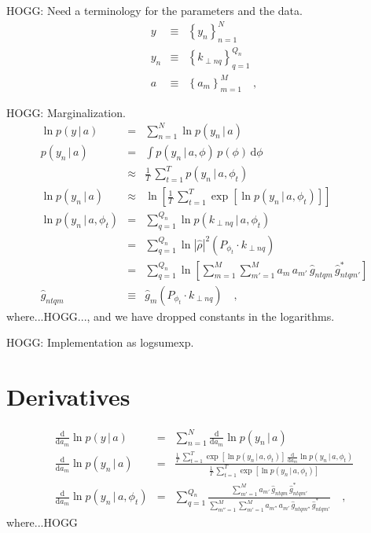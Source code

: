 \documentclass[12pt]{article}
\newcommand{\setof}[1]{\left\{{#1}\right\}}
\newcommand{\given}{\,|\,}
\newcommand{\dd}{\mathrm{d}}
\begin{document}
HOGG: Need a terminology for the parameters and the data.
\begin{eqnarray}
  y &\equiv& \setof{y_n}_{n=1}^N
  \\
  y_n &\equiv& \setof{k_{\perp nq}}_{q=1}^{Q_n}
  \\
  a &\equiv& \setof{a_m}_{m=1}^M
  \quad,
\end{eqnarray}

HOGG: Marginalization.
\begin{eqnarray}
  \ln p(y\given a) &=& \sum_{n=1}^N \ln p(y_n\given a)
  \\
  p(y_n\given a) &=& \int p(y_n\given a,\phi)\,p(\phi)\,\dd\phi
  \\
  &\approx& \frac{1}{T}\,\sum_{t=1}^T p(y_n\given a,\phi_t)
  \\
  \ln p(y_n\given a) &\approx& \ln\left[\frac{1}{T}\,\sum_{t=1}^T \exp\left[\ln p(y_n\given a,\phi_t)\right]\right]
  \\
  \ln p(y_n\given a,\phi_t) &=& \sum_{q=1}^{Q_n} \ln p(k_{\perp nq}\given a,\phi_t)
  \\
  &=& \sum_{q=1}^{Q_n} \ln |\hat{\rho}|^2(P_{\phi_t}\cdot k_{\perp nq})
  \\
  &=& \sum_{q=1}^{Q_n} \ln\left[ \sum_{m=1}^M\sum_{m'=1}^M a_m\,a_{m'}\,\hat{g}_{ntqm}\,\hat{g}_{ntqm'}^{\ast} \right]
  \\
  \hat{g}_{ntqm} &\equiv& \hat{g}_m(P_{\phi_t}\cdot k_{\perp nq})
  \quad,
\end{eqnarray}
where...HOGG..., and we
have dropped constants in the logarithms.

HOGG: Implementation as logsumexp.

\section{Derivatives}

\begin{eqnarray}
  \frac{\dd}{\dd a_m}\ln p(y\given a) &=& \sum_{n=1}^N \frac{\dd}{\dd a_m}\ln p(y_n\given a)
  \\
  \frac{\dd}{\dd a_m}\ln p(y_n\given a)
    &=& \frac{\displaystyle
      \frac{1}{T}\,\sum_{t=1}^T \exp\left[\ln p(y_n\given a,\phi_t)\right]\,\frac{\dd}{\dd a_m}\ln p(y_n\given a,\phi_t)}%
             {\displaystyle
      \frac{1}{T}\,\sum_{t=1}^T \exp\left[\ln p(y_n\given a,\phi_t)\right]}
  \\
  \frac{\dd}{\dd a_m}\ln p(y_n\given a,\phi_t)
    &=& \sum_{q=1}^{Q_n} \frac{\displaystyle
      \sum_{m'=1}^M a_{m'}\,\hat{g}_{ntqm}\,\hat{g}_{ntqm'}^{\ast}}%
             {\displaystyle
      \sum_{m''=1}^M\sum_{m'=1}^M a_{m''}\,a_{m'}\,\hat{g}_{ntqm''}\,\hat{g}_{ntqm'}^{\ast}}
  \quad,
\end{eqnarray}
where...HOGG
\end{document}
